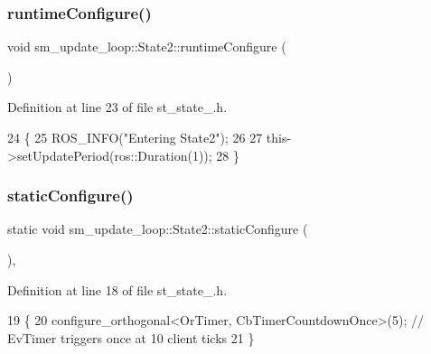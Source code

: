 \subsubsection{\texorpdfstring{runtime\+Configure()}{runtimeConfigure()}}
{\footnotesize\ttfamily void sm\+\_\+update\+\_\+loop\+::\+State2\+::runtime\+Configure (\begin{DoxyParamCaption}{ }\end{DoxyParamCaption})\hspace{0.3cm}{\ttfamily [inline]}}



Definition at line 23 of file st\+\_\+state\+\_.\+h.


\begin{DoxyCode}
24     \{
25         ROS\_INFO(\textcolor{stringliteral}{"Entering State2"});
26 
27         this->setUpdatePeriod(ros::Duration(1));
28     \}
\end{DoxyCode}
\mbox{\label{structsm__update__loop_1_1State2_a1def7d74eb295ef6fdfdd122affa921d}} 
\subsubsection{\texorpdfstring{static\+Configure()}{staticConfigure()}}
{\footnotesize\ttfamily static void sm\+\_\+update\+\_\+loop\+::\+State2\+::static\+Configure (\begin{DoxyParamCaption}{ }\end{DoxyParamCaption})\hspace{0.3cm}{\ttfamily [inline]}, {\ttfamily [static]}}



Definition at line 18 of file st\+\_\+state\+\_.\+h.


\begin{DoxyCode}
19     \{
20         configure\_orthogonal<OrTimer, CbTimerCountdownOnce>(5); \textcolor{comment}{// EvTimer triggers once at 10 client ticks}
21     \}
\end{DoxyCode}
\mbox{\label{structsm__update__loop_1_1State2_aab947246406d3225de2f83f336ae24a3}} 
